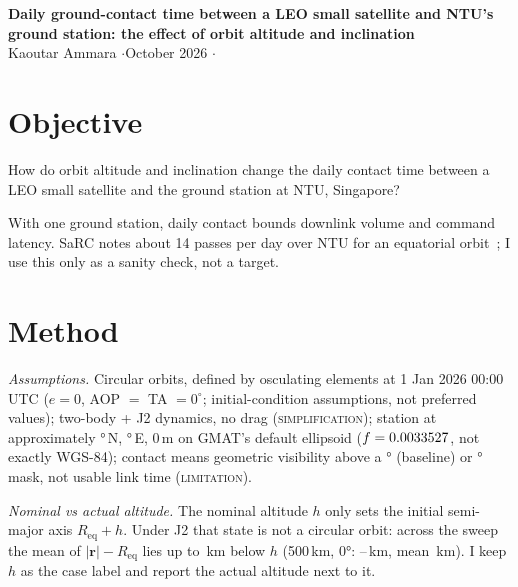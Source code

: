 \documentclass[11pt]{article}
\newcommand{\lbl}[1]{\textsc{#1}}
\begin{document}
\begin{center}
{\large\bfseries Daily ground-contact time between a LEO small satellite and NTU's ground station: the effect of orbit altitude and inclination}\\[0.4em]
{\small Kaoutar Ammara \quad$\cdot$\quad October 2026 \quad$\cdot$}
\end{center}
\vspace{-0.3em}
\noindent{}

\section{Objective}\label{sec:obj}
How do orbit altitude and inclination change the daily contact time between a LEO small satellite and the ground station at NTU, Singapore?

With one ground station, daily contact bounds downlink volume and command latency. SaRC notes about 14 passes per day over NTU for an equatorial orbit~\cite{sarc}; I use this only as a sanity check, not a target.

\section{Method}\label{sec:method}
\emph{Assumptions.} Circular orbits, defined by osculating elements at 1 Jan 2026 00:00 UTC ($e=0$, AOP $=$ TA $=0^\circ$; initial-condition assumptions, not preferred values); two-body + J2 dynamics, no drag (\lbl{simplification}); station at approximately \StationLat°\,N, \StationLon°\,E, 0\,m on GMAT's default ellipsoid ($f=0.0033527$, not exactly WGS-84); contact means geometric visibility above a \MaskBase° (baseline) or \MaskSens° mask, not usable link time (\lbl{limitation}).

\emph{Nominal vs actual altitude.} The nominal altitude $h$ only sets the initial semi-major axis $R_\mathrm{eq}+h$. Under J2 that state is not a circular orbit: across the sweep the mean of $|\mathbf r|-R_\mathrm{eq}$ lies up to \MaxAltOffset\,km below $h$ (500\,km, 0°: \BaseMinAlt--\BaseMaxAlt\,km, mean \BaseMeanAlt\,km). I keep $h$ as the case label and report the actual altitude next to it.
\end{document}
